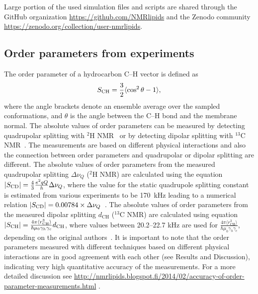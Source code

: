 \documentclass[pre,aps,floatfix,authordate1-4,twocolumn]{revtex4-1}
\begin{document}
Large portion of the used simulation files and scripts are shared through the GitHub organization \url{https://github.com/NMRlipids}
and the Zenodo community \url{https://zenodo.org/collection/user-nmrlipids}.

\subsection{Order parameters from experiments}
The order parameter of a hydrocarbon C--H vector is defined as 
\begin{equation}\label{orderP}
S_{{\rm CH}}=\frac{3}{2}\langle \cos^2 \theta-1 \rangle,
\end{equation} 
where the angle brackets denote an ensemble average over the sampled conformations, and $\theta$ is the angle between the C--H bond and the membrane normal.
The absolute values of order parameters can be measured by detecting quadrupolar splitting with $^2$H NMR~\cite{seelig77c} or by detecting dipolar 
splitting with $^{13}$C NMR~\cite{hong95a,gross97,dvinskikh05a,ferreira13}. The measurements are based on
different physical interactions and also the connection between order parameters and quadrupolar or dipolar splitting
are different. The absolute values of order parameters from the measured quadrupolar splitting $\Delta \nu_Q$ ($^2$H NMR) are calculated using 
the equation $|S_{{\rm CD}}|=\frac{4}{3} \frac{e^2qQ}{h} \Delta \nu_Q$, where the value for the static quadrupole
splitting constant is estimated from various experiments to be 170~kHz leading to a numerical relation $|S_{{\rm CD}}|=0.00784 \times \Delta \nu_Q$~\cite{seelig77c}. 
The absolute values of order parameters from the measured dipolar splitting $d_\mathrm{CH}$ ($^{13}$C NMR) are calculated using equation
$|S_{{\rm CH}}|=\frac{4\pi\langle r_\mathrm{CH}^3 \rangle}{\hbar \mu_0 \gamma_h \gamma_c} d_\mathrm{CH}$, where
values between 20.2--22.7 kHz are used for $\frac{4\pi\langle r_\mathrm{CH}^3 \rangle}{\hbar \mu_0 \gamma_h \gamma_c}$,
depending on the original authors~\cite{hong95a,gross97,dvinskikh05a,ferreira13}.
It is important to note that the order parameters measured with different techniques based on different physical interactions are in good agreement
with each other (see Results and Discussion), indicating very high quantitative accuracy of the measurements.
For a more detailed discussion see \url{http://nmrlipids.blogspot.fi/2014/02/accuracy-of-order-parameter-measurements.html}
.
\end{document}
